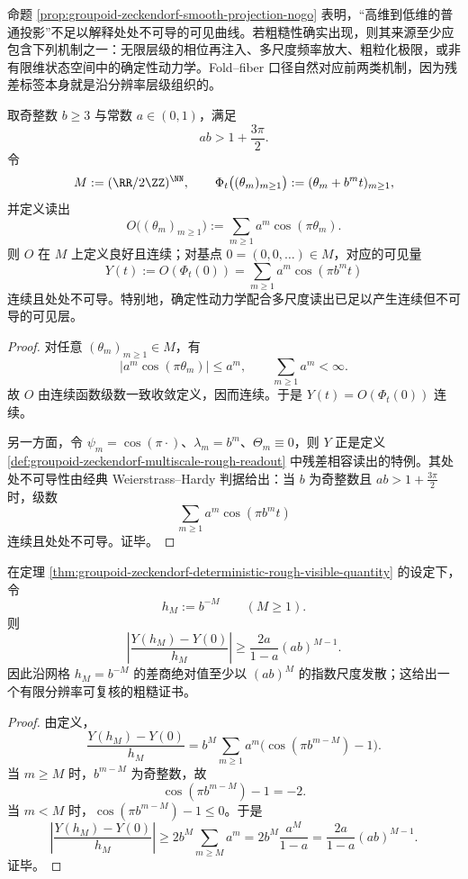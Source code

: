\begin{remark}[粗糙可见量的来源边界]\label{rem:groupoid-zeckendorf-smooth-projection-boundary}
命题 \ref{prop:groupoid-zeckendorf-smooth-projection-nogo} 表明，“高维到低维的普通投影”不足以解释处处不可导的可见曲线。若粗糙性确实出现，则其来源至少应包含下列机制之一：无限层级的相位再注入、多尺度频率放大、粗粒化极限，或非有限维状态空间中的确定性动力学。Fold--fiber 口径自然对应前两类机制，因为残差标签本身就是沿分辨率层级组织的。
\end{remark}

\begin{theorem}[确定性多尺度读出的不可导实现]\label{thm:groupoid-zeckendorf-deterministic-rough-visible-quantity}
取奇整数 \(b\ge 3\) 与常数 \(a\in(0,1)\)，满足
\[
ab>1+\frac{3\pi}{2}.
\]
令
\[
M:=(\RR/2\ZZ)^{\NN},
\qquad
\Phi_t\bigl((\theta_m)_{m\ge 1}\bigr):=
(\theta_m+b^m t)_{m\ge 1},
\]
并定义读出
\[
O\bigl((\theta_m)_{m\ge 1}\bigr):=
\sum_{m\ge 1} a^m\cos(\pi\theta_m).
\]
则 \(O\) 在 \(M\) 上定义良好且连续；对基点 \(0=(0,0,\dots)\in M\)，对应的可见量
\[
Y(t):=O(\Phi_t(0))
=
\sum_{m\ge 1} a^m\cos(\pi b^m t)
\]
连续且处处不可导。特别地，确定性动力学配合多尺度读出已足以产生连续但不可导的可见层。
\end{theorem}
\begin{proof}
对任意 \((\theta_m)_{m\ge 1}\in M\)，有
\[
\left|a^m\cos(\pi\theta_m)\right|\le a^m,
\qquad
\sum_{m\ge 1} a^m<\infty.
\]
故 \(O\) 由连续函数级数一致收敛定义，因而连续。于是 \(Y(t)=O(\Phi_t(0))\) 连续。

另一方面，令 \(\psi_m=\cos(\pi\cdot)\)、\(\lambda_m=b^m\)、\(\Theta_m\equiv 0\)，则 \(Y\) 正是定义 \ref{def:groupoid-zeckendorf-multiscale-rough-readout} 中残差相容读出的特例。其处处不可导性由经典 Weierstrass--Hardy 判据给出：当 \(b\) 为奇整数且 \(ab>1+\frac{3\pi}{2}\) 时，级数
\[
\sum_{m\ge 1} a^m\cos(\pi b^m t)
\]
连续且处处不可导。证毕。
\end{proof}

\begin{proposition}[网格差商的指数发散证书]\label{prop:groupoid-zeckendorf-rough-visible-difference-quotient-certificate}
在定理 \ref{thm:groupoid-zeckendorf-deterministic-rough-visible-quantity} 的设定下，令
\[
h_M:=b^{-M}\qquad (M\ge 1).
\]
则
\[
\left|
\frac{Y(h_M)-Y(0)}{h_M}
\right|
\ge
\frac{2a}{1-a}(ab)^{M-1}.
\]
因此沿网格 \(h_M=b^{-M}\) 的差商绝对值至少以 \((ab)^M\) 的指数尺度发散；这给出一个有限分辨率可复核的粗糙证书。
\end{proposition}
\begin{proof}
由定义，
\[
\frac{Y(h_M)-Y(0)}{h_M}
=
b^M\sum_{m\ge 1} a^m\bigl(\cos(\pi b^{m-M})-1\bigr).
\]
当 \(m\ge M\) 时，\(b^{m-M}\) 为奇整数，故
\[
\cos(\pi b^{m-M})-1=-2.
\]
当 \(m<M\) 时，\(\cos(\pi b^{m-M})-1\le 0\)。于是
\[
\left|
\frac{Y(h_M)-Y(0)}{h_M}
\right|
\ge
2b^M\sum_{m\ge M}a^m
=
2b^M\frac{a^M}{1-a}
=
\frac{2a}{1-a}(ab)^{M-1}.
\]
证毕。
\end{proof}


